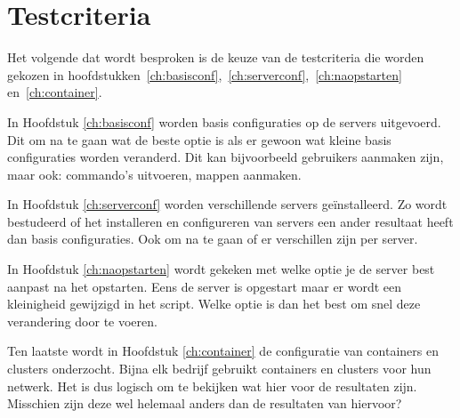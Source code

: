 \section{Testcriteria}
Het volgende dat wordt besproken is de keuze van de testcriteria die worden gekozen in hoofdstukken~\ref{ch:basisconf},~\ref{ch:serverconf},~\ref{ch:naopstarten} en~\ref{ch:container}. 

In Hoofdstuk \ref*{ch:basisconf} worden basis configuraties op de servers uitgevoerd. Dit om na te gaan wat de beste optie is als er gewoon wat kleine basis configuraties worden veranderd. Dit kan bijvoorbeeld gebruikers aanmaken zijn, maar ook: commando's uitvoeren, mappen aanmaken. 

In Hoofdstuk \ref*{ch:serverconf} worden verschillende servers geïnstalleerd. Zo wordt bestudeerd of het installeren en configureren van servers een ander resultaat heeft dan basis configuraties. Ook om na te gaan of er verschillen zijn per server.

In Hoofdstuk \ref*{ch:naopstarten} wordt gekeken met welke optie je de server best aanpast na het opstarten. Eens de server is opgestart maar er wordt een kleinigheid gewijzigd in het script. Welke optie is dan het best om snel deze verandering door te voeren.

Ten laatste wordt in Hoofdstuk \ref*{ch:container} de configuratie van containers en clusters onderzocht. Bijna elk bedrijf gebruikt containers en clusters voor hun netwerk. Het is dus logisch om te bekijken wat hier voor de resultaten zijn. Misschien zijn deze wel helemaal anders dan de resultaten van hiervoor?


